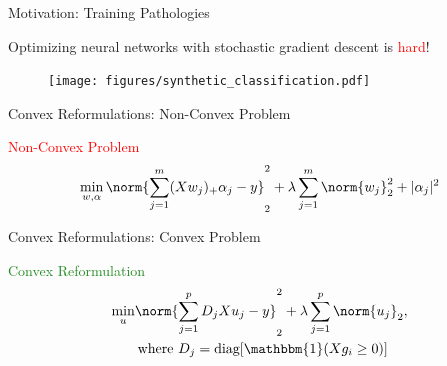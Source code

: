 \documentclass[usenames,dvipsnames,mathserif,notheorems]{beamer}
\begin{document}
\begin{frame}{Motivation: Training Pathologies}
	\begin{center}
		\Large
		Optimizing neural networks with stochastic gradient descent is \textcolor{red}{hard}!
	\end{center}

	\begin{figure}[]
		\centering
		\texttt{[image: figures/synthetic\_classification.pdf]}
	\end{figure}

\end{frame}

\begin{frame}{Convex Reformulations: Non-Convex Problem}

	{\large \textcolor{Red}{Non-Convex Problem}}
	\[
		\min_{w, \alpha} \norm{\sum_{j=1}^m (X w_j)_+ \alpha_j - y}_2^2
		+ \lambda \sum_{j=1}^m \norm{w_j}_2^2 + |\alpha_j|^2
	\]

	\begin{figure}[]
		\centering
		
	\end{figure}

\end{frame}
\begin{frame}{Convex Reformulations: Convex Problem}

	{\large \textcolor{ForestGreen}{Convex Reformulation}}
	\[
		\begin{aligned}
			\min_{u} & \norm{\sum_{j=1}^p D_j X u_j - y}_2^2 +
			\lambda \sum_{j=1}^p \norm{u_j}_2,                 \\
			         & \hspace{0.2em} \text{where }
			D_j = \text{diag}[\mathbbm{1}(X g_i \geq 0)]
		\end{aligned}
	\]
	\begin{figure}[]
		\centering
		
	\end{figure}
\end{frame}
\end{document}
